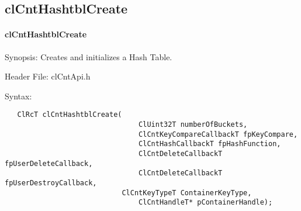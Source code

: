 \subsection{clCntHashtblCreate}
\hypertarget{pagecnt102}{}\paragraph{cl\-Cnt\-Hashtbl\-Create}\label{pagecnt102}
\begin{Desc}
\item[Synopsis:]Creates and initializes a Hash Table.\end{Desc}
\begin{Desc}
\item[Header File:]clCntApi.h\end{Desc}
\begin{Desc}
\item[Syntax:]

\footnotesize\begin{verbatim}   ClRcT clCntHashtblCreate(
              	      			ClUint32T numberOfBuckets,
                      			ClCntKeyCompareCallbackT fpKeyCompare,
                      			ClCntHashCallbackT fpHashFunction,
                      			ClCntDeleteCallbackT fpUserDeleteCallback,
                      			ClCntDeleteCallbackT fpUserDestroyCallback,
          	      			ClCntKeyTypeT ContainerKeyType,
                      			ClCntHandleT* pContainerHandle);
\end{verbatim}
\normalsize
\end{Desc}
